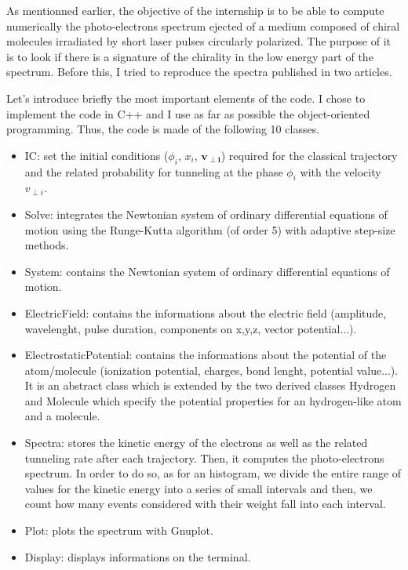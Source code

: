 \documentclass[a4paper]{article}
\begin{document}
As mentionned earlier, the objective of the internship is to be able to compute numerically the photo-electrons spectrum ejected of a medium composed of chiral molecules irradiated by short laser pulses circularly polarized. The purpose of it is to look if there is a signature of the chirality in the low energy part of the spectrum. Before this, I tried to reproduce the spectra published in two articles. 
\par
Let's introduce briefly the most important elements of the code. I chose to implement the code in C++ and I use as far as possible the object-oriented programming. Thus, the code is made of the following 10 classes.
\begin{itemize}
\item
IC: set the initial conditions ($\phi_{i}$, $x_{i}$, $\mathbf{v_{\perp i}}$) required for the classical trajectory and the related probability for tunneling at the phase $\phi_{i}$ with the velocity $v_{\perp i}$.
\item
Solve: integrates the Newtonian system of ordinary differential equations of motion using the Runge-Kutta algorithm (of order 5) with adaptive step-size methods.
\item
System: contains the Newtonian system of ordinary differential equations of motion.
\item
ElectricField: contains the informations about the electric field (amplitude, wavelenght, pulse duration, components on x,y,z, vector potential...).
\item
ElectrostaticPotential: contains the informations about the potential of the atom/molecule (ionization potential, charges, bond lenght, potential value...). It is an abstract class which is extended by the two derived classes Hydrogen and Molecule which specify the potential properties for an hydrogen-like atom and a molecule. 
\item
Spectra: stores the kinetic energy of the electrons as well as the related tunneling rate after each trajectory. Then, it computes the photo-electrons spectrum. In order to do so, as for an histogram, we divide the entire range of values for the kinetic energy into a series of small intervals and then, we count how many events considered with their weight fall into each interval.
\item
Plot: plots the spectrum with Gnuplot.
\item
Display: displays informations on the terminal. 
\end{itemize}
\par
\end{document}
